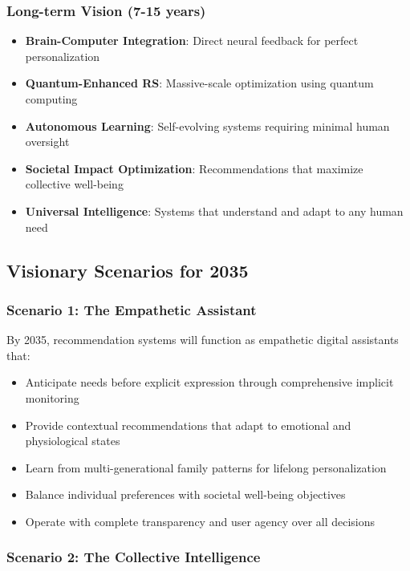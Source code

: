 \subsubsection{Long-term Vision (7-15 years)}

\begin{itemize}
    \item \textbf{Brain-Computer Integration}: Direct neural feedback for perfect personalization
    \item \textbf{Quantum-Enhanced RS}: Massive-scale optimization using quantum computing
    \item \textbf{Autonomous Learning}: Self-evolving systems requiring minimal human oversight
    \item \textbf{Societal Impact Optimization}: Recommendations that maximize collective well-being
    \item \textbf{Universal Intelligence}: Systems that understand and adapt to any human need
\end{itemize}

\subsection{Visionary Scenarios for 2035}

\subsubsection{Scenario 1: The Empathetic Assistant}

By 2035, recommendation systems will function as empathetic digital assistants that:
\begin{itemize}
    \item Anticipate needs before explicit expression through comprehensive implicit monitoring
    \item Provide contextual recommendations that adapt to emotional and physiological states
    \item Learn from multi-generational family patterns for lifelong personalization
    \item Balance individual preferences with societal well-being objectives
    \item Operate with complete transparency and user agency over all decisions
\end{itemize}

\subsubsection{Scenario 2: The Collective Intelligence}


